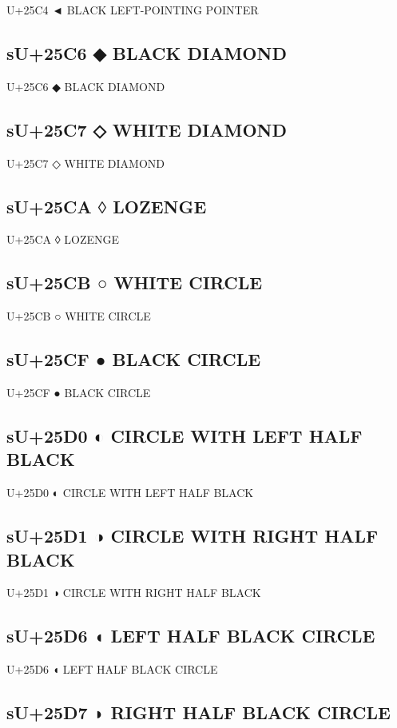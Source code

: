 U+25C4 ◄ BLACK LEFT-POINTING POINTER

\subsection{sU+25C6 ◆ BLACK DIAMOND}

U+25C6 ◆ BLACK DIAMOND

\subsection{sU+25C7 ◇ WHITE DIAMOND}

U+25C7 ◇ WHITE DIAMOND

\subsection{sU+25CA ◊ LOZENGE}

U+25CA ◊ LOZENGE

\subsection{sU+25CB ○ WHITE CIRCLE}

U+25CB ○ WHITE CIRCLE

\subsection{sU+25CF ● BLACK CIRCLE}

U+25CF ● BLACK CIRCLE

\subsection{sU+25D0 ◐ CIRCLE WITH LEFT HALF BLACK}

U+25D0 ◐ CIRCLE WITH LEFT HALF BLACK

\subsection{sU+25D1 ◑ CIRCLE WITH RIGHT HALF BLACK}

U+25D1 ◑ CIRCLE WITH RIGHT HALF BLACK

\subsection{sU+25D6 ◖ LEFT HALF BLACK CIRCLE}

U+25D6 ◖ LEFT HALF BLACK CIRCLE

\subsection{sU+25D7 ◗ RIGHT HALF BLACK CIRCLE}

